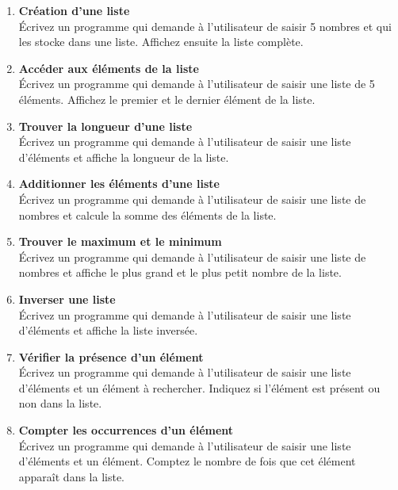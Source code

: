 

\begin{enumerate}

    \item \textbf{Création d'une liste} \\
    Écrivez un programme qui demande à l'utilisateur de saisir 5 nombres et qui les stocke dans une liste. Affichez ensuite la liste complète.

    \item \textbf{Accéder aux éléments de la liste} \\
    Écrivez un programme qui demande à l'utilisateur de saisir une liste de 5 éléments. Affichez le premier et le dernier élément de la liste.

    \item \textbf{Trouver la longueur d'une liste} \\
    Écrivez un programme qui demande à l'utilisateur de saisir une liste d'éléments et affiche la longueur de la liste.

    \item \textbf{Additionner les éléments d'une liste} \\
    Écrivez un programme qui demande à l'utilisateur de saisir une liste de nombres et calcule la somme des éléments de la liste.

    \item \textbf{Trouver le maximum et le minimum} \\
    Écrivez un programme qui demande à l'utilisateur de saisir une liste de nombres et affiche le plus grand et le plus petit nombre de la liste.

    \item \textbf{Inverser une liste} \\
    Écrivez un programme qui demande à l'utilisateur de saisir une liste d'éléments et affiche la liste inversée.

    \item \textbf{Vérifier la présence d'un élément} \\
    Écrivez un programme qui demande à l'utilisateur de saisir une liste d'éléments et un élément à rechercher. Indiquez si l'élément est présent ou non dans la liste.

    \item \textbf{Compter les occurrences d'un élément} \\
    Écrivez un programme qui demande à l'utilisateur de saisir une liste d'éléments et un élément. Comptez le nombre de fois que cet élément apparaît dans la liste.


\end{enumerate}
